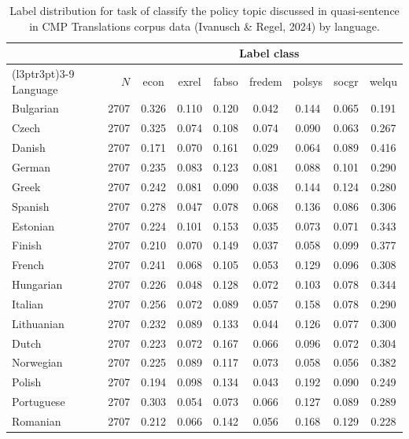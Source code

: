 \begin{table}[!t]

\caption{\label{tab:label_distribution_by_lang_cmp_translations_sample_topic}Label distribution for task of classify the policy topic discussed in quasi-sentence in CMP Translations corpus data (Ivanusch \& Regel, 2024) by language.}
\centering
\fontsize{10}{12}\selectfont
\begin{tabular}[t]{lrccccccc}
\toprule
\multicolumn{2}{c}{ } & \multicolumn{7}{c}{Label class} \\
\cmidrule(l{3pt}r{3pt}){3-9}
Language & $N$ & econ & exrel & fabso & fredem & polsys & socgr & welqu\\
\midrule
Bulgarian & 2707 & 0.326 & 0.110 & 0.120 & 0.042 & 0.144 & 0.065 & 0.191\\
Czech & 2707 & 0.325 & 0.074 & 0.108 & 0.074 & 0.090 & 0.063 & 0.267\\
Danish & 2707 & 0.171 & 0.070 & 0.161 & 0.029 & 0.064 & 0.089 & 0.416\\
German & 2707 & 0.235 & 0.083 & 0.123 & 0.081 & 0.088 & 0.101 & 0.290\\
Greek & 2707 & 0.242 & 0.081 & 0.090 & 0.038 & 0.144 & 0.124 & 0.280\\
Spanish & 2707 & 0.278 & 0.047 & 0.078 & 0.068 & 0.136 & 0.086 & 0.306\\
Estonian & 2707 & 0.224 & 0.101 & 0.153 & 0.035 & 0.073 & 0.071 & 0.343\\
Finish & 2707 & 0.210 & 0.070 & 0.149 & 0.037 & 0.058 & 0.099 & 0.377\\
French & 2707 & 0.241 & 0.068 & 0.105 & 0.053 & 0.129 & 0.096 & 0.308\\
Hungarian & 2707 & 0.226 & 0.048 & 0.128 & 0.072 & 0.103 & 0.078 & 0.344\\
Italian & 2707 & 0.256 & 0.072 & 0.089 & 0.057 & 0.158 & 0.078 & 0.290\\
Lithuanian & 2707 & 0.232 & 0.089 & 0.133 & 0.044 & 0.126 & 0.077 & 0.300\\
Dutch & 2707 & 0.223 & 0.072 & 0.167 & 0.066 & 0.096 & 0.072 & 0.304\\
Norwegian & 2707 & 0.225 & 0.089 & 0.117 & 0.073 & 0.058 & 0.056 & 0.382\\
Polish & 2707 & 0.194 & 0.098 & 0.134 & 0.043 & 0.192 & 0.090 & 0.249\\
Portuguese & 2707 & 0.303 & 0.054 & 0.073 & 0.066 & 0.127 & 0.089 & 0.289\\
Romanian & 2707 & 0.212 & 0.066 & 0.142 & 0.056 & 0.168 & 0.129 & 0.228\\

\end{tabular}
\end{table}

